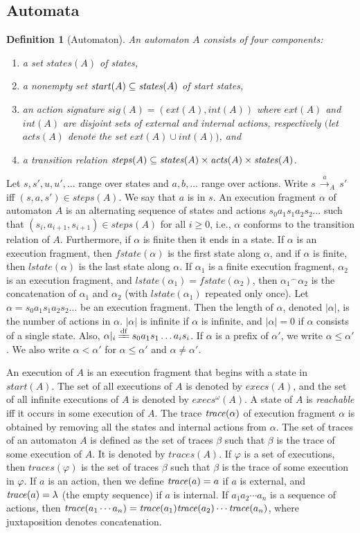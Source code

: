 \documentclass[11pt]{article}
\newcommand{\bn}{\begin{enumerate}}
\newcommand{\en}{\end{enumerate}}
\newcommand{\bd}{\begin{definition}}
\newcommand{\ed}{\end{definition}}
\newcommand{\un}{\cup}
\newcommand{\lla}[2]{\mbox{$\, \stackrel{#1}{\longrightarrow}_{#2} \,$}}
\newcommand{\acts}{\mathit{acts}}
\newcommand{\al}{\alpha}
\newcommand{\cat}{\mbox{$^\frown$}}
\newcommand{\iexecs}{\mathit{execs}^\omega}
\newcommand{\ext}{\mathit{ext}}
\newcommand{\fstate}{\mathit{fstate}}
\renewcommand{\int}{\mathit{int}}
\newcommand{\lstate}{\mathit{lstate}}
\newcommand{\sig}{\mathit{sig}}
\newcommand{\start}{\mathit{start}}
\newcommand{\states}{\mathit{states}}
\newcommand{\steps}{\mathit{steps}}
\newcommand{\traces}{\mathit{traces}}
\newtheorem{definition}{Definition}
\begin{document}
\subsection{Automata}
\label{sec:automata}

\bd[Automaton]
An \emph{automaton} $A$ consists of four components:
\bn
\item a set $\states(A)$ of states,
\item a nonempty set $\start(A) \sub \states(A)$ of start states,
\item an action signature $\sig(A) = (\ext(A), \int(A))$ where
$\ext(A)$ and $\int(A)$ are disjoint sets of external and internal
actions, respectively $($let $\acts(A)$ denote the set $\ext(A) \un
\int(A)$$)$, and
\item a transition relation $\steps(A) \sub \states(A) \times
\acts(A) \times \states(A)$.
\label{def:automaton}
\en
\ed

Let $s,s',u,u',\ldots$ range over states and $a,b,\ldots$ range over
actions. Write $s \lla{a}{A} s'$ iff $(s,a,s') \in \steps(A)$. We say
that $a$ is  in $s$.  An execution fragment $\al$ of
automaton $A$ is
an alternating sequence of states and actions $s_0 a_1 s_1 a_2 s_2
\ldots$ such that $(s_i, a_{i+1}, s_{i+1}) \in \steps(A)$ for all $i
\geq 0$, i.e., $\al$ conforms to the
transition relation of $A$. Furthermore, if $\al$ is finite then it
ends in a state. 
If $\al$ is an execution fragment, then
$\fstate(\al)$ is the first state along $\al$, and if 
$\al$ is finite, then
$\lstate(\al)$ is the last state along $\al$.
If $\al_1$ is a
finite execution fragment, $\al_2$ is an execution fragment, and
$\lstate(\al_1) = \fstate(\al_2)$, then $\al_1 \cat \al_2$ is the
concatenation of $\al_1$ and $\al_2$ (with $\lstate(\al_1)$ repeated
only once). 
Let $\al = s_0 a_1 s_1 a_2 s_2 \ldots$ be an execution fragment. Then
the length of $\al$, denoted $|\al|$, is the number of actions in
$\al$. $|\al|$ is infinite if $\al$ is infinite, 
and $|\al| = 0$ if $\al$ consists of a single state.
Also, $\al|_i \df  s_0 a_1 s_1 \ldots a_i s_i$.
If $\al$ is a prefix of $\al'$, we write $\al \leq \al'$. We also
write $\al < \al'$ for $\al \leq \al'$ and $\al \neq \al'$.

An execution of $A$ is an execution fragment that begins with a state
in $\start(A)$. 
The set of all executions of $A$ is denoted by $\mathit{execs}(A)$, and
the set of all infinite executions of $A$ is denoted by $\iexecs(A)$.
A state of $A$ is \emph{reachable} iff it occurs in some execution of
$A$.
The trace $\mathit{trace}(\alpha)$ of execution fragment $\alpha$ is obtained
by removing all the states and internal actions from $\al$.
The set of traces of an automaton $A$ is defined as the set of traces
$\beta$ such that $\beta$ is the trace of some execution of $A$.  It
is denoted by $\traces(A)$.
If $\varphi$ is a set of executions, then
$\traces(\varphi)$ is the set of traces $\beta$ such that $\beta$ is the
trace of some execution in $\varphi$. 
If $a$ is an action, then we define $\mathit{trace}(a) = a$ if $a$ is external, and
$\mathit{trace}(a) = \lambda$ (the empty sequence) if $a$ is internal.
If $a_1 a_2 \cdots a_n$ is a sequence of actions, then 
$\mathit{trace}(a_1 \cdots a_n) = \mathit{trace}(a_1) \mathit{trace}(a_2) \cdots \mathit{trace}(a_n)$,
where juxtaposition denotes concatenation.
\end{document}
